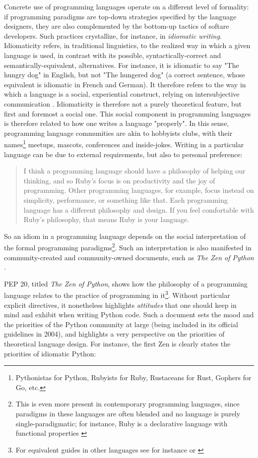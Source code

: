 Concrete use of programming languages operate on a different level of formality: if programming paradigms are top-down strategies specified by the language designers, they are also complemented by the bottom-up tactics of softare developers. Such practices crystallize, for instance, in \emph{idiomatic writing}. Idiomaticity refers, in traditional linguistics, to the realized way in which a given language is used, in contrast with its possible, syntactically-correct and semantically-equivalent, alternatives. For instance, it is idiomatic to say "The hungry dog" in English, but not "The hungered dog" (a correct sentence, whose equivalent is idiomatic in French and German). It therefore refers to the way in which a language is a social, experiential construct, relying on intersubjective communication \citep{voloshinov_marxism_1986}. Idiomaticity is therefore not a purely theoretical feature, but first and foremost a social one. This social component in programming languages is therefore related to how one writes a language "properly". In this sense, programming language communities are akin to hobbyists clubs, with their names\footnote{Pythonistas for Python, Rubyists for Ruby, Rustaceans for Rust, Gophers for Go, etc.} meetups, mascots, conferences and inside-jokes. Writing in a particular language can be due to external requirements, but also to personal preference:

\begin{quote}
  I think a programming language should have a philosophy of helping our thinking, and so Ruby's focus is on productivity and the joy of programming. Other programming languages, for example, focus instead on simplicity, performance, or something like that. Each programming language has a different philosophy and design. If you feel comfortable with Ruby's philosophy, that means Ruby is your language. \citep{matsumoto_yukihiro_2019}
\end{quote}

So an idiom in a programming language depends on the social interpretation of the formal programming paradigms\footnote{This is even more present in contemporary programming languages, since paradigms in these languages are often blended and no language is purely single-paradigmatic; for instance, Ruby is a declarative language with functional properties \citep{kidd_why_2005}}. Such an interpretation is also manifested in community-created and community-owned documents, such as \emph{The Zen of Python} \citep{peters_code_1999}.

PEP 20, titled \emph{The Zen of Python}, shows how the philosophy of a programming language relates to the practice of programming in it\footnote{For equivalent guides in other languages see for instance \citep{spencer_ten_1994} or \citep{cheney_practical_2019}}. Without particular explicit directives, it nonetheless highlights \emph{attitudes} that one should keep in mind and exhibit when writing Python code. Such a document sets the mood and the priorities of the Python community at large (being included in its official guidelines in 2004), and highlights a very perspective on the priorities of theoretical language design. For instance, the first Zen is clearly states the priorities of idiomatic Python:

